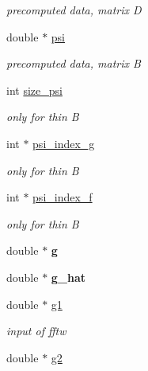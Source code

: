 \begin{CompactItemize}
\begin{CompactList}\small\item\em precomputed data, matrix D \item\end{CompactList}\item 
\hypertarget{structnfst__plan_o18}{
double $\ast$ \hyperlink{structnfst__plan_o18}{psi}}
\label{structnfst__plan_o18}

\begin{CompactList}\small\item\em precomputed data, matrix B \item\end{CompactList}\item 
\hypertarget{structnfst__plan_o19}{
int \hyperlink{structnfst__plan_o19}{size\_\-psi}}
\label{structnfst__plan_o19}

\begin{CompactList}\small\item\em only for thin B \item\end{CompactList}\item 
\hypertarget{structnfst__plan_o20}{
int $\ast$ \hyperlink{structnfst__plan_o20}{psi\_\-index\_\-g}}
\label{structnfst__plan_o20}

\begin{CompactList}\small\item\em only for thin B \item\end{CompactList}\item 
\hypertarget{structnfst__plan_o21}{
int $\ast$ \hyperlink{structnfst__plan_o21}{psi\_\-index\_\-f}}
\label{structnfst__plan_o21}

\begin{CompactList}\small\item\em only for thin B \item\end{CompactList}\item 
\hypertarget{structnfst__plan_o22}{
double $\ast$ {\bf g}}
\label{structnfst__plan_o22}

\item 
\hypertarget{structnfst__plan_o23}{
double $\ast$ {\bf g\_\-hat}}
\label{structnfst__plan_o23}

\item 
\hypertarget{structnfst__plan_o24}{
double $\ast$ \hyperlink{structnfst__plan_o24}{g1}}
\label{structnfst__plan_o24}

\begin{CompactList}\small\item\em input of fftw \item\end{CompactList}\item 
\hypertarget{structnfst__plan_o25}{
double $\ast$ \hyperlink{structnfst__plan_o25}{g2}}
\label{structnfst__plan_o25}


\end{CompactItemize}
